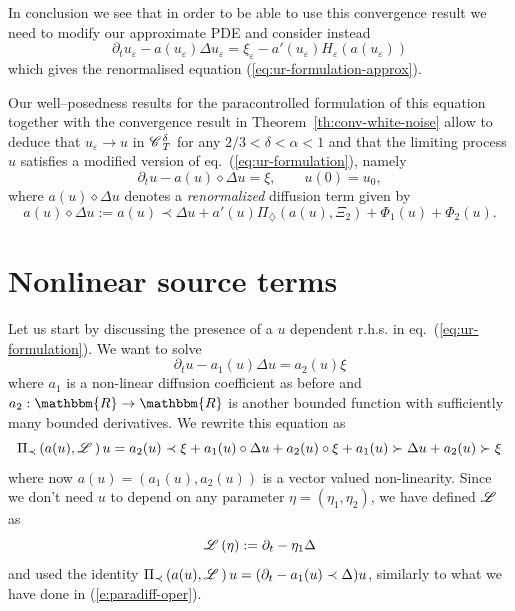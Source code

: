\documentclass[11pt,reqno]{amsart}
\newcommand{\assign}{:=}
\newcommand{\tmtextit}[1]{{\itshape{#1}}}
\newcommand{\CC}{\mathscr{C} \hspace{.1em}}
\newcommand{\LL}{\mathscr{L} \hspace{.2em}}
\begin{document}
In conclusion we see that in order to be able to use this convergence result
we need to modify our approximate PDE and consider instead
\[ \partial_t u_{\varepsilon} - a (u_{\varepsilon}) \Delta u_{\varepsilon} =
   \xi_{\varepsilon} - a' (u_{\varepsilon}) H_{\varepsilon} (a
   (u_{\varepsilon})) \]
which gives the renormalised equation (\ref{eq:ur-formulation-approx}).

Our well--posedness results for the paracontrolled formulation of this
equation together with the convergence result in
Theorem~\ref{th:conv-white-noise} allow to deduce that $u_{\varepsilon}
\rightarrow u$ in $\CC^{\delta}_T$ for any $2 / 3 < \delta < \alpha < 1$ and
that the limiting process $u$ satisfies a modified version of
eq.~(\ref{eq:ur-formulation}), namely
\[ \partial_t u - a (u) \diamond \Delta u = \xi, \qquad u (0) = u_0, \]
where $a (u) \diamond \Delta u$ denotes a \tmtextit{renormalized} diffusion
term given by
\begin{equation}
  a (u) \diamond \Delta u \assign a (u) \prec \Delta u + a' (u)
  \Pi_{\diamondsuit} (a (u), \Xi_2) + \Phi_1 (u) + \Phi_2 (u) .
  \label{eq:ren-diff}
\end{equation}
\section{Nonlinear source terms}\label{sec:gen-nonlinear}

Let us start by discussing the presence of a $u$ dependent r.h.s. in
eq.~(\ref{eq:ur-formulation}). We want to solve
\[ \partial_t u - a_1 (u) \Delta u = a_2 (u) \xi \]
where $a_1$ is a non-linear diffusion coefficient as before and $a_2 :
\mathbbm{R} \rightarrow \mathbbm{R}$ is another bounded function with
sufficiently many bounded derivatives. We rewrite this equation as
\[ \Pi_{\prec} \left( a (u), \LL \right) u = a_2 (u) \prec \xi + a_1 (u) \circ
   \Delta u + a_2 (u) \circ \xi + a_1 (u) \succ \Delta u + a_2 (u) \succ \xi
\]
where now $a (u) = (a_1 (u), a_2 (u))$ is a vector valued non-linearity. Since
we don't need $u$ to depend on any parameter $\eta = (\eta_1, \eta_2)$, we
have defined $\LL$ as
\[ \LL (\eta) \assign \partial_t - \eta_1 \Delta \]
and used the identity $\Pi_{\prec} \left( a (u), \LL \right) u = (\partial_t -
a_1 (u) \prec \Delta) u$, similarly to what we have done in
(\ref{e:paradiff-oper}).
\end{document}
